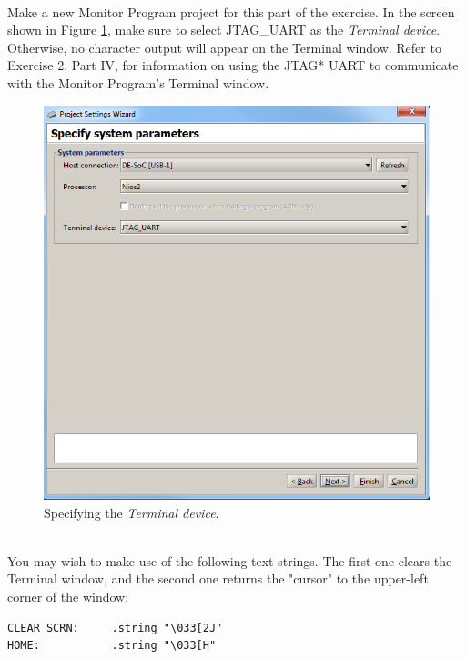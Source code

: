 \documentclass[epsfig,10pt,fullpage]{article}
\newcommand{\CommonDocsPath}{../../../../common/docs}
\begin{document}
~\\
\noindent
Make a new Monitor Program project for this part of the exercise. In the screen shown in Figure
\ref{fig:terminal}, make sure to select {\sf JTAG\_UART} as the {\it Terminal
device}. Otherwise, no character output will appear on the Terminal window.
Refer to Exercise 2, Part IV, for information on using the JTAG* UART to communicate with 
the Monitor Program's Terminal window.  

\begin{figure}[htb]
	\begin{center}
	\includegraphics[scale=0.58]{figures/terminal.png}
	\end{center}
	\vspace{-0.25cm}\caption{Specifying the {\it Terminal device}.}
\label{fig:terminal}
\end{figure}

~\\
\noindent
You may wish to make use of the following text 
strings. The first one clears the Terminal window, and the second one returns the "cursor" to the 
upper-left corner of the window:
\vspace{0.25cm}
~\\
\begin{minipage}[t]{12.5 cm}
\begin{lstlisting}[style=defaultNiosStyle]
CLEAR_SCRN: 	.string "\033[2J"
HOME: 			.string "\033[H"
\end{lstlisting}
\end{minipage}



\end{document}
